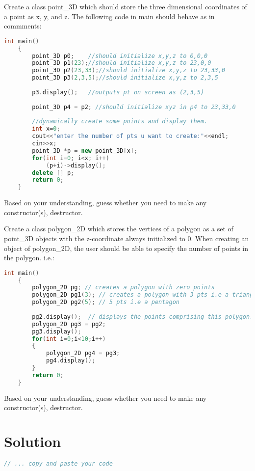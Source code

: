 \documentclass[11pt,fleqn]{book} %
\begin{document}
\begin{problem} Create a class point\_3D which should store the three dimensional coordinates of a point as x, y, and z. The following code in main should behave as in commments:
	\begin{lstlisting}[language=C++, caption = Create class point\_3D]
	int main()
	{
		point_3D p0;	//should initialize x,y,z to 0,0,0
		point_3D p1(23);//should initialize x,y,z to 23,0,0
		point_3D p2(23,33);//should initialize x,y,z to 23,33,0
		point_3D p3(2,3,5);//should initialize x,y,z to 2,3,5
		
		p3.display();	//outputs pt on screen as (2,3,5)
		
		point_3D p4 = p2; //should initialize xyz in p4 to 23,33,0
		
		//dynamically create some points and display them.
		int x=0;
		cout<<"enter the number of pts u want to create:"<<endl;
		cin>>x;
		point_3D *p = new point_3D[x];
		for(int i=0; i<x; i++)
			(p+i)->display();
		delete [] p;		
		return 0;
	}
	\end{lstlisting}
	
\noindent Based on your understanding, guess whether you need to make any constructor(s), destructor.\\
\end{problem}
\begin{problem} Create a class polygon\_2D which stores the vertices of a polygon as a set of point\_3D objects with the z-coordinate always initialized to 0. When creating an object of polygon\_2D, the user should be able to specify the number of points in the polygon. i.e.:
	\begin{lstlisting}[language=C++, caption = Create class polygon\_2D]
	int main() 
	{
		polygon_2D pg; // creates a polygon with zero points
		polygon_2D pg1(3); // creates a polygon with 3 pts i.e a triangle
		polygon_2D pg2(5); // 5 pts i.e a pentagon
		
		pg2.display(); 	// displays the points comprising this polygon. 
		polygon_2D pg3 = pg2;
		pg3.display();
		for(int i=0;i<10;i++)
		{
			polygon_2D pg4 = pg3;
			pg4.display();
		}		
		return 0;
	}
	\end{lstlisting}	
	Based on your understanding, guess whether you need to make any constructor(s), destructor.\\
\end{problem}


\newpage
\section{Solution}
\begin{lstlisting}[language=C++]
  // ... copy and paste your code
\end{lstlisting}
\end{document}
